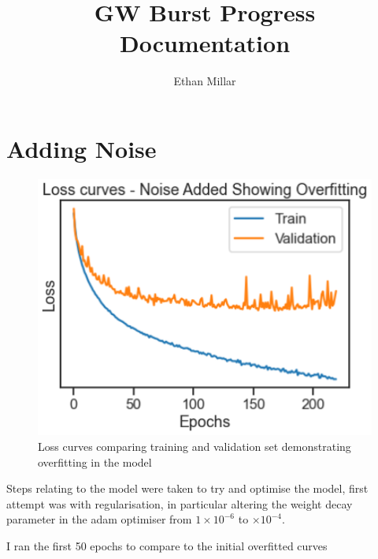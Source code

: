 \documentclass[a4paper, 12pt]{article}
\begin{document}
\title{\textbf{GW Burst Progress Documentation}}
\author{Ethan Millar}
\date{}
\maketitle

\section{Adding Noise}

\begin{figure}[H]
  \centering
  \includegraphics[scale = 0.7]{Overfit.PNG}
  \caption{Loss curves comparing training and validation set demonstrating overfitting in the model}
  \label{fig:overfit}
\end{figure}

Steps relating to the model were taken to try and optimise the model, first attempt was with regularisation, in particular altering the weight decay parameter in the adam optimiser from $1 \times 10^{-6}$ to $  \times 10^{-4}$.

I ran the first 50 epochs to compare to the initial overfitted curves
\end{document}
